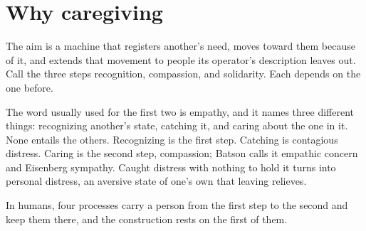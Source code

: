 \section{Why caregiving}
\label{sec:20.3}
The aim is a machine that registers another's need, moves toward them because of it, and extends that movement to people its operator's description leaves out. Call the three steps recognition, compassion, and solidarity. Each depends on the one before.

The word usually used for the first two is empathy, and it names three different things: recognizing another's state, catching it, and caring about the one in it. None entails the others. Recognizing is the first step. Catching is contagious distress. Caring is the second step, compassion; Batson calls it empathic concern and Eisenberg sympathy. Caught distress with nothing to hold it turns into personal distress, an aversive state of one's own that leaving relieves.

In humans, four processes carry a person from the first step to the second and keep them there, and the construction rests on the first of them.

